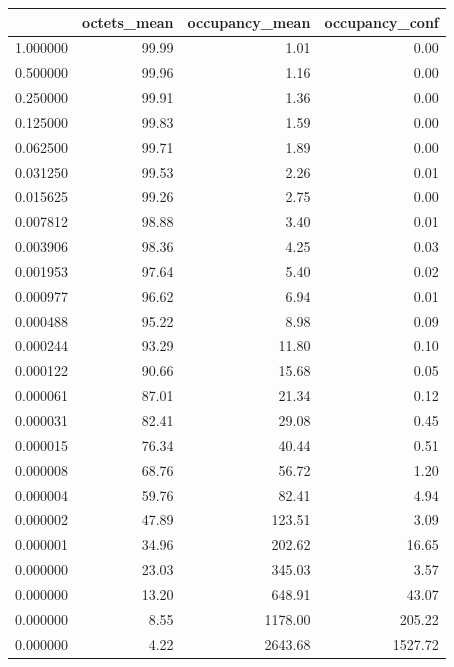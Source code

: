 \begin{tabular}{lrrr}
\toprule
 & octets_mean & occupancy_mean & occupancy_conf \\
\midrule
1.000000 & 99.99 & 1.01 & 0.00 \\
0.500000 & 99.96 & 1.16 & 0.00 \\
0.250000 & 99.91 & 1.36 & 0.00 \\
0.125000 & 99.83 & 1.59 & 0.00 \\
0.062500 & 99.71 & 1.89 & 0.00 \\
0.031250 & 99.53 & 2.26 & 0.01 \\
0.015625 & 99.26 & 2.75 & 0.00 \\
0.007812 & 98.88 & 3.40 & 0.01 \\
0.003906 & 98.36 & 4.25 & 0.03 \\
0.001953 & 97.64 & 5.40 & 0.02 \\
0.000977 & 96.62 & 6.94 & 0.01 \\
0.000488 & 95.22 & 8.98 & 0.09 \\
0.000244 & 93.29 & 11.80 & 0.10 \\
0.000122 & 90.66 & 15.68 & 0.05 \\
0.000061 & 87.01 & 21.34 & 0.12 \\
0.000031 & 82.41 & 29.08 & 0.45 \\
0.000015 & 76.34 & 40.44 & 0.51 \\
0.000008 & 68.76 & 56.72 & 1.20 \\
0.000004 & 59.76 & 82.41 & 4.94 \\
0.000002 & 47.89 & 123.51 & 3.09 \\
0.000001 & 34.96 & 202.62 & 16.65 \\
0.000000 & 23.03 & 345.03 & 3.57 \\
0.000000 & 13.20 & 648.91 & 43.07 \\
0.000000 & 8.55 & 1178.00 & 205.22 \\
0.000000 & 4.22 & 2643.68 & 1527.72 \\
\bottomrule
\end{tabular}

